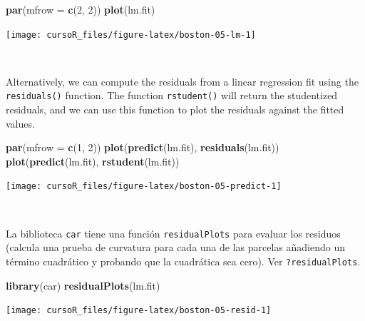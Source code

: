 \documentclass[]{book}
\newenvironment{Shaded}{\begin{snugshade}}{\end{snugshade}}
\newcommand{\KeywordTok}[1]{\textcolor[rgb]{0.13,0.29,0.53}{\textbf{#1}}}
\newcommand{\DataTypeTok}[1]{\textcolor[rgb]{0.13,0.29,0.53}{#1}}
\newcommand{\DecValTok}[1]{\textcolor[rgb]{0.00,0.00,0.81}{#1}}
\newcommand{\NormalTok}[1]{#1}
\begin{document}
\begin{Shaded}
\begin{Highlighting}[]
\KeywordTok{par}\NormalTok{(}\DataTypeTok{mfrow =} \KeywordTok{c}\NormalTok{(}\DecValTok{2}\NormalTok{, }\DecValTok{2}\NormalTok{))}
\KeywordTok{plot}\NormalTok{(lm.fit)}
\end{Highlighting}
\end{Shaded}

\begin{center}\texttt{[image: cursoR\_files/figure-latex/boston-05-lm-1]} \end{center}

~

Alternatively, we can compute the residuals from a linear regression fit
using the \texttt{residuals()} function. The function
\texttt{rstudent()} will return the studentized residuals, and we can
use this function to plot the residuals against the fitted values.

\begin{Shaded}
\begin{Highlighting}[]
\KeywordTok{par}\NormalTok{(}\DataTypeTok{mfrow =} \KeywordTok{c}\NormalTok{(}\DecValTok{1}\NormalTok{, }\DecValTok{2}\NormalTok{))}
\KeywordTok{plot}\NormalTok{(}\KeywordTok{predict}\NormalTok{(lm.fit), }\KeywordTok{residuals}\NormalTok{(lm.fit))}
\KeywordTok{plot}\NormalTok{(}\KeywordTok{predict}\NormalTok{(lm.fit), }\KeywordTok{rstudent}\NormalTok{(lm.fit))}
\end{Highlighting}
\end{Shaded}

\begin{center}\texttt{[image: cursoR\_files/figure-latex/boston-05-predict-1]} \end{center}

~

La biblioteca \texttt{car} tiene una función \texttt{residualPlots} para
evaluar los residuos (calcula una prueba de curvatura para cada una de
las parcelas añadiendo un término cuadrático y probando que la
cuadrática sea cero). Ver \texttt{?residualPlots}.

\begin{Shaded}
\begin{Highlighting}[]
\KeywordTok{library}\NormalTok{(car)}
\KeywordTok{residualPlots}\NormalTok{(lm.fit)}
\end{Highlighting}
\end{Shaded}

\begin{center}\texttt{[image: cursoR\_files/figure-latex/boston-05-resid-1]} \end{center}
\end{document}
